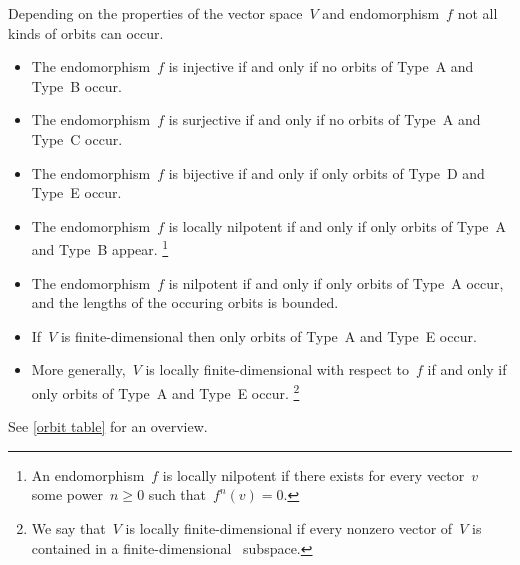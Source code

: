 \documentclass[a4paper,11pt]{scrartcl}
\begin{document}
Depending on the properties of the vector space~$V$ and endomorphism~$f$ not all kinds of orbits can occur.
\begin{itemize}
  \item
    The endomorphism~$f$ is injective if and only if no orbits of Type~A and Type~B occur.
  \item
  The endomorphism~$f$ is surjective if and only if no orbits of Type~A and Type~C occur.
  \item
    The endomorphism~$f$ is bijective if and only if only orbits of Type~D and Type~E occur.
  \item
    The endomorphism~$f$ is locally nilpotent if and only if only orbits of Type~A and Type~B appear.%
    \footnote{
      An endomorphism~$f$ is locally nilpotent if there exists for every vector~$v$ some power~$n \geq 0$ such that~$f^n(v) = 0$.
    }
  \item
    The endomorphism~$f$ is nilpotent if and only if only orbits of Type~A occur, and the lengths of the occuring orbits is bounded.
  \item
    If~$V$ is finite-dimensional then only orbits of Type~A and Type~E occur.
  \item
    More generally,~$V$ is locally finite-dimensional with respect to~$f$ if and only if only orbits of Type~A and Type~E occur.%
    \footnote{
      We say that~$V$ is locally finite-dimensional if every nonzero vector of~$V$ is contained in a finite-dimensional~ subspace.
    }
\end{itemize}
See \cref{orbit table} for an overview.
\end{document}
